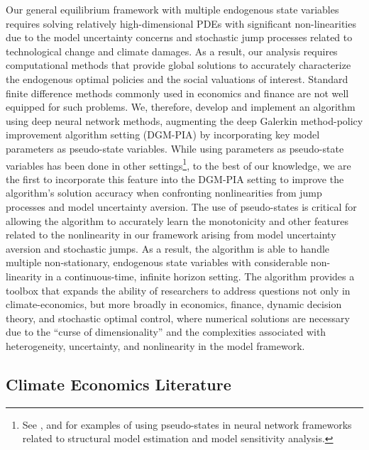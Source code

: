 \documentclass[12pt]{article}
\begin{document}
Our general equilibrium framework with multiple endogenous state variables requires solving relatively high-dimensional PDEs with significant non-linearities due to the model uncertainty concerns and stochastic jump processes related to technological change and climate damages. As a result, our analysis requires computational methods that provide global solutions to accurately characterize the endogenous optimal policies and the social valuations of interest. Standard finite difference methods commonly used in economics and finance are not well equipped for such problems. We, therefore, develop and implement an algorithm using deep neural network methods, augmenting the deep Galerkin method-policy improvement algorithm setting (DGM-PIA) by incorporating key model parameters as pseudo-state variables. While using parameters as pseudo-state variables has been done in other settings\footnote{See \cite{norets2012estimation, duarte2018gradient}, and   \cite{friedl2023deep}
for examples of using pseudo-states in neural network frameworks related to structural model estimation and model sensitivity analysis.}, to the best of our knowledge, we are the first to incorporate this feature into the DGM-PIA setting to improve the algorithm's solution accuracy when confronting nonlinearities from jump processes and model uncertainty aversion. The use of pseudo-states is critical for allowing the algorithm to accurately learn the monotonicity and other features related to the nonlinearity in our framework arising from model uncertainty aversion and stochastic jumps. As a result, the algorithm is able to handle multiple non-stationary, endogenous state variables with considerable non-linearity in a continuous-time, infinite horizon setting. The algorithm provides a toolbox that expands the ability of researchers to address questions not only in climate-economics, but more broadly in economics, finance, dynamic decision theory, and stochastic optimal control, where numerical solutions are necessary due to the ``curse of dimensionality'' and the complexities associated with heterogeneity, uncertainty, and nonlinearity in the model framework. 


\subsection{Climate Economics Literature}
\end{document}
